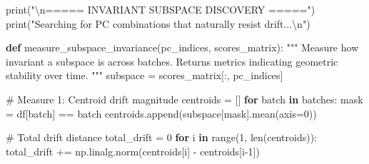 \documentclass[
  letterpaper,
  DIV=11,
  numbers=noendperiod]{scrartcl}
\newenvironment{Shaded}{\begin{snugshade}}{\end{snugshade}}
\newcommand{\BuiltInTok}[1]{\textcolor[rgb]{0.00,0.23,0.31}{#1}}
\newcommand{\CharTok}[1]{\textcolor[rgb]{0.13,0.47,0.30}{#1}}
\newcommand{\CommentTok}[1]{\textcolor[rgb]{0.37,0.37,0.37}{#1}}
\newcommand{\ControlFlowTok}[1]{\textcolor[rgb]{0.00,0.23,0.31}{\textbf{#1}}}
\newcommand{\DecValTok}[1]{\textcolor[rgb]{0.68,0.00,0.00}{#1}}
\newcommand{\KeywordTok}[1]{\textcolor[rgb]{0.00,0.23,0.31}{\textbf{#1}}}
\newcommand{\NormalTok}[1]{\textcolor[rgb]{0.00,0.23,0.31}{#1}}
\newcommand{\OperatorTok}[1]{\textcolor[rgb]{0.37,0.37,0.37}{#1}}
\newcommand{\StringTok}[1]{\textcolor[rgb]{0.13,0.47,0.30}{#1}}
\renewenvironment{Shaded}{%
  \begin{tcolorbox}[%
    enhanced,%
    colback=codebg,%
    colframe=codebg,%
    borderline west={3pt}{0pt}{sectionblue},%
    fontupper=\small\ttfamily,%
    boxrule=0pt,%
    arc=0pt,%
    boxsep=5pt,%
    left=2mm,%
    right=2mm,%
    top=2mm,%
    bottom=2mm%
  ]%
}{%
  \end{tcolorbox}%
}
\begin{document}
\begin{Shaded}
\begin{Highlighting}[]
\BuiltInTok{print}\NormalTok{(}\StringTok{"}\CharTok{\textbackslash{}n}\StringTok{===== INVARIANT SUBSPACE DISCOVERY ====="}\NormalTok{)}
\BuiltInTok{print}\NormalTok{(}\StringTok{"Searching for PC combinations that naturally resist drift...}\CharTok{\textbackslash{}n}\StringTok{"}\NormalTok{)}

\KeywordTok{def}\NormalTok{ measure\_subspace\_invariance(pc\_indices, scores\_matrix):}
    \CommentTok{"""}
\CommentTok{    Measure how invariant a subspace is across batches.}
\CommentTok{    Returns metrics indicating geometric stability over time.}
\CommentTok{    """}
\NormalTok{    subspace }\OperatorTok{=}\NormalTok{ scores\_matrix[:, pc\_indices]}
    
    \CommentTok{\# Measure 1: Centroid drift magnitude}
\NormalTok{    centroids }\OperatorTok{=}\NormalTok{ []}
    \ControlFlowTok{for}\NormalTok{ batch }\KeywordTok{in}\NormalTok{ batches:}
\NormalTok{        mask }\OperatorTok{=}\NormalTok{ df[}\StringTok{\textquotesingle{}batch\textquotesingle{}}\NormalTok{] }\OperatorTok{==}\NormalTok{ batch}
\NormalTok{        centroids.append(subspace[mask].mean(axis}\OperatorTok{=}\DecValTok{0}\NormalTok{))}
    
    \CommentTok{\# Total drift distance}
\NormalTok{    total\_drift }\OperatorTok{=} \DecValTok{0}
    \ControlFlowTok{for}\NormalTok{ i }\KeywordTok{in} \BuiltInTok{range}\NormalTok{(}\DecValTok{1}\NormalTok{, }\BuiltInTok{len}\NormalTok{(centroids)):}
\NormalTok{        total\_drift }\OperatorTok{+=}\NormalTok{ np.linalg.norm(centroids[i] }\OperatorTok{{-}}\NormalTok{ centroids[i}\OperatorTok{{-}}\DecValTok{1}\NormalTok{])}
    

\end{Highlighting}
\end{Shaded}
\end{document}

